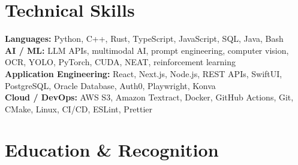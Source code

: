 \documentclass{../../../../Styles/MG-Style}
\begin{document}
\section{Technical Skills}
\small
\textbf{Languages:} Python, C++, Rust, TypeScript, JavaScript, SQL, Java, Bash \\
\textbf{AI / ML:} LLM APIs, multimodal AI, prompt engineering, computer vision, OCR, YOLO, PyTorch, CUDA, NEAT, reinforcement learning \\
\textbf{Application Engineering:} React, Next.js, Node.js, REST APIs, SwiftUI, PostgreSQL, Oracle Database, Auth0, Playwright, Konva \\
\textbf{Cloud / DevOps:} AWS S3, Amazon Textract, Docker, GitHub Actions, Git, CMake, Linux, CI/CD, ESLint, Prettier

\section{Education \& Recognition}
\begin{itemize}
\end{itemize}
\end{document}
